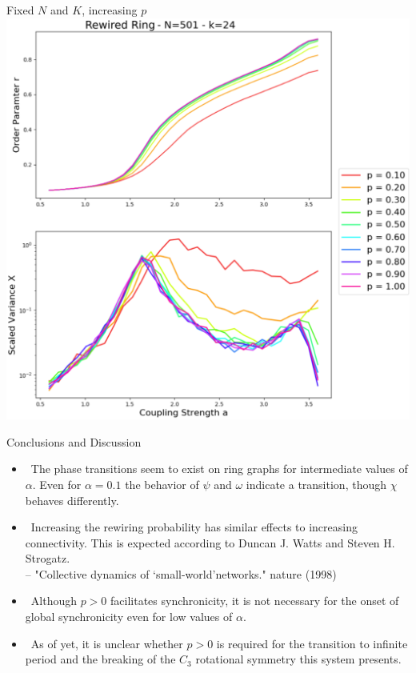 \documentclass[serif,mathserif]{beamer}
\begin{document}
\begin{frame}
    \centering
    Fixed $N$ and $K$, increasing $p$\\
    \vspace{0.25cm}
    \includegraphics[height=0.8\textheight]{rvsavsp.eps}
\end{frame}

\begin{frame}{Conclusions and Discussion}
    \begin{itemize}
        \item \ \pause The phase transitions seem to exist on ring graphs for intermediate values of $\alpha$. Even for $\alpha=0.1$ the behavior of $\psi$ and $\omega$ indicate a transition, though $\chi$ behaves differently.
        \vspace{0.1cm}
        \item \ \pause Increasing the rewiring probability has similar effects to increasing connectivity. This is expected according to Duncan J. Watts and Steven H. Strogatz.\\
            \hfill -- "Collective dynamics of ‘small-world’networks." nature (1998)
        \vspace{0.1cm}
        \item \ \pause Although $p>0$ facilitates synchronicity, it is not necessary for the onset of global synchronicity even for low values of $\alpha$.
        \vspace{0.1cm}
    \item \ \pause As of yet, it is unclear whether $p>0$ is required for the transition to infinite period and the breaking of the $C_3$ rotational symmetry this system presents.
    \end{itemize}
\end{frame}
\end{document}
